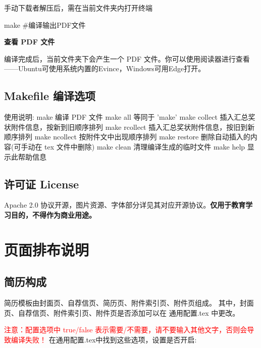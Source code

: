 \documentclass[a4paper,12pt]{ctexart}
\newcommand{\emp}[1]{
	\colorbox{spanbg}{#1}
}
\begin{document}
	\qquad 手动下载者解压后，需在当前文件夹内打开终端
	\begin{bashcode}[xleftmargin=4em]
  make #编译输出PDF文件
	\end{bashcode}
	
	\textbf{查看 PDF 文件}
	
	\qquad 编译完成后，当前文件夹下会产生一个 PDF 文件。你可以使用阅读器进行查看——Ubuntu可使用系统内置的Evince，Windows可用Edge打开。
		
	\subsection{Makefile 编译选项}
	\begin{bashcode}
  使用说明:
	make              编译 PDF 文件
	make all          等同于 'make'
	make collect      插入汇总奖状附件信息，按新到旧顺序排列
	make rcollect     插入汇总奖状附件信息，按旧到新顺序排列
	make ncollect     按附件文中出现顺序排列
	make restore      删除自动插入的内容(可手动在 tex 文件中删除)
	make clean        清理编译生成的临时文件
	make help         显示此帮助信息
	
	\end{bashcode}
	
	\subsection{许可证 License}
	Apache 2.0 协议开源，图片资源、字体部分详见其对应开源协议。\textbf{仅用于教育学习目的，不得作为商业用途。}
	
	\newpage
	\section{页面排布说明}
	
	\subsection{简历构成}
	简历模板由封面页、自荐信页、简历页、附件索引页、附件页组成。
	其中，封面页、自荐信页、附件索引页、附件页是否添加可以在\emp{通用配置.tex}中更改。
	
	\textcolor{red}{注意：配置选项中 true/false 表示需要/不需要，请不要输入其他文字，否则会导致编译失败！}
	在通用配置.tex中找到这些选项，设置是否开启:
	\begin{latexcode}
    \def\theCoverPageNeed{false} %
    \def\theCoverLetterNeed{true}  %
    \def\theAttachmentIndexPageNeed{true} %
    \def\theAttachmentPageNeed{true}  %
	\end{latexcode}
	
\end{document}
